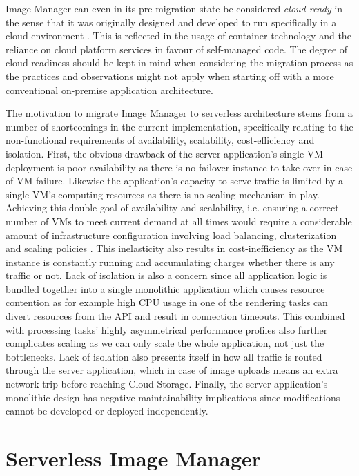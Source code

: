 Image Manager can even in its pre-migration state be considered \textit{cloud-ready} in the sense that it was originally designed and developed to run specifically in a cloud environment \parencite{pozdniakova17cloudready}. This is reflected in the usage of container technology and the reliance on cloud platform services in favour of self-managed code. The degree of cloud-readiness should be kept in mind when considering the migration process as the practices and observations might not apply when starting off with a more conventional on-premise application architecture.

The motivation to migrate Image Manager to serverless architecture stems from a number of shortcomings in the current implementation, specifically relating to the non-functional requirements of availability, scalability, cost-efficiency and isolation. First, the obvious drawback of the server application's single-VM deployment is poor availability as there is no failover instance to take over in case of VM failure. Likewise the application's capacity to serve traffic is limited by a single VM's computing resources as there is no scaling mechanism in play. Achieving this double goal of availability and scalability, i.e. ensuring a correct number of VMs to meet current demand at all times would require a considerable amount of infrastructure configuration involving load balancing, clusterization and scaling policies \parencite{jonas19berkeleyView}. This inelasticity also results in cost-inefficiency as the VM instance is constantly running and accumulating charges whether there is any traffic or not. Lack of isolation is also a concern since all application logic is bundled together into a single monolithic application which causes resource contention as for example high CPU usage in one of the rendering tasks can divert resources from the API and result in connection timeouts. This combined with processing tasks' highly asymmetrical performance profiles also further complicates scaling as we can only scale the whole application, not just the bottlenecks. Lack of isolation also presents itself in how all traffic is routed through the server application, which in case of image uploads means an extra network trip before reaching Cloud Storage. Finally, the server application's monolithic design has negative maintainability implications since modifications cannot be developed or deployed independently.

\section{Serverless Image Manager}

